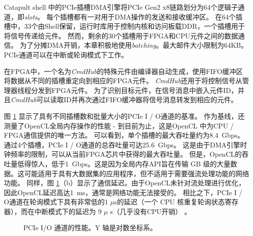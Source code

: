 Catapult shell \cite {putnam2014reconfigurable}中的PCIe插槽DMA引擎将PCIe Gen2 x8链路划分为64个逻辑子通道，即\textit {slots}。
每个插槽都有一对用于DMA操作的发送和接收缓冲区。
在64个插槽中，33个由Shell保留，运行时库用于控制内核和访问板载DDR，一个插槽用于将信号传递给\name 元件。
然而，剩余的30个插槽用于FPGA和CPU元件之间的数据通信。
为了分摊DMA开销，本章积极地使用\textit {batching}。最大邮件大小限制为64KB。
PCIe通道可以在中断或轮询模式下工作。


在FPGA中，一个名为\textit {CmdHub}的特殊元件由\name 编译器自动生成，使用FIFO缓冲区将数据从不同的插槽重定向到相应的FPGA元件。
\textit {CmdHub}还用于将控制信号从管理器线程分发到FPGA元件。
为了识别目标元件，在信号消息中嵌入元件ID，并且\textit {CmdHub}可以读取ID并再次通过FIFO缓冲器将信号消息转发到相应的元件。

图 \ref {clicknp:fig:pcie} 显示了具有不同插槽数和批量大小的PCIe I / O通道的基准。
作为基线，还测量了OpenCL全局内存操作的性能 - 到目前为止，这是OpenCL \cite {opencl}中为CPU / FPGA通信提供的唯一方法。
可以看到，单个插槽的最大吞吐量约为8.4~Gbps。
通过4个插槽，PCIe I / O通道的总吞吐量可达25.6~Gbps。
这是由于DMA引擎时钟频率的限制，可以从当前FPGA芯片中获得的最大吞吐量。
但是，OpenCL的吞吐量低得惊人，低于1~Gbps。这是因为全局内存API旨在传输 GB 级的大量数据。这可能适用于具有大数据集的应用程序，但不适用于需要强流处理功能的网络功能。
同样，图 \ref {clicknp:fig:pcie}（b）显示了通信延迟。由于OpenCL未针对流处理进行优化，因此OpenCL延迟高达1~ms，通常是网络功能无法接受的。
相比之下，PCIe I / O通道在轮询模式下具有非常低的1 $\mu$s的延迟（一个 CPU 核重复轮询状态寄存器），而在中断模式下的延迟为 9 $\mu$ s（几乎没有CPU开销） 。

\begin{figure}[htbp]
	\centering

	\caption{PCIe I/O 通道的性能。Y 轴是对数坐标系。}

	\label{clicknp:fig:pcie}
\end{figure}


